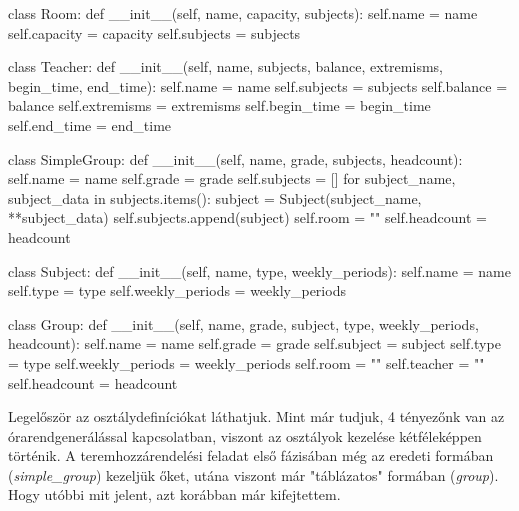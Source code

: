 


\begin{python}
	class Room:
	def __init__(self, name, capacity, subjects):
	self.name = name
	self.capacity = capacity
	self.subjects = subjects
	
	
	class Teacher:
	def __init__(self, name, subjects, balance, extremisms, begin_time,
	end_time):
	self.name = name
	self.subjects = subjects
	self.balance = balance
	self.extremisms = extremisms
	self.begin_time = begin_time
	self.end_time = end_time
	
	
	class SimpleGroup:
	def __init__(self, name, grade, subjects, headcount):
	self.name = name
	self.grade = grade
	self.subjects = []
	for subject_name, subject_data in subjects.items():
	subject = Subject(subject_name, **subject_data)
	self.subjects.append(subject)
	self.room = ""
	self.headcount = headcount
	
	
	class Subject:
	def __init__(self, name, type, weekly_periods):
	self.name = name
	self.type = type
	self.weekly_periods = weekly_periods
	
	
	class Group:
	def __init__(self, name, grade, subject, type, weekly_periods,
	headcount):
	self.name = name
	self.grade = grade
	self.subject = subject
	self.type = type
	self.weekly_periods = weekly_periods
	self.room = ""
	self.teacher = ""
	self.headcount = headcount
\end{python}

Legelőször az osztálydefiníciókat láthatjuk. Mint már tudjuk, 4 tényezőnk van az órarendgenerálással kapcsolatban, viszont az osztályok kezelése kétféleképpen történik. A teremhozzárendelési feladat első fázisában még az eredeti formában (\textit{simple\_group}) kezeljük őket, utána viszont már "táblázatos" formában (\textit{group}). Hogy utóbbi mit jelent, azt korábban már kifejtettem.


